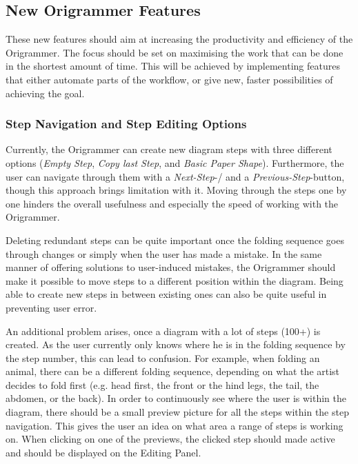 
\subsection{New Origrammer Features}

These new features should aim at increasing the productivity and efficiency of the Origrammer. The focus should be set on maximising the work that can be done in the shortest amount of time. This will be achieved by implementing features that either automate parts of the workflow, or give new, faster possibilities of achieving the goal.

\subsubsection{Step Navigation and Step Editing Options}

Currently, the Origrammer can create new diagram steps with three different options (\emph{Empty Step}, \emph{Copy last Step}, and \emph{Basic Paper Shape}). Furthermore, the user can navigate through them with a \emph{Next-Step}-/ and a \emph{Previous-Step}-button, though this approach brings limitation with it. Moving through the steps one by one hinders the overall usefulness and especially the speed of working with the Origrammer.

Deleting redundant steps can be quite important once the folding sequence goes through changes or simply when the user has made a mistake. In the same manner of offering solutions to user-induced mistakes, the Origrammer should make it possible to move steps to a different position within the diagram. Being able to create new steps in between existing ones can also be quite useful in preventing user error.

An additional problem arises, once a diagram with a lot of steps (100+) is created. As the user currently only knows where he is in the folding sequence by the step number, this can lead to confusion. For example, when folding an animal, there can be a different folding sequence, depending on what the artist decides to fold first (e.g. head first, the front or the hind legs, the tail, the abdomen, or the back). In order to continuously see where the user is within the diagram, there should be a small preview picture for all the steps within the step navigation. This gives the user an idea on what area a range of steps is working on. When clicking on one of the previews, the clicked step should made active and should be displayed on the Editing Panel.


